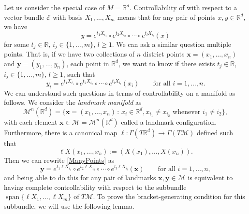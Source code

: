 \documentclass[10pt]{amsart}
\theoremstyle{remark}
\DeclareMathOperator{\spn}{span}
\newcommand{\E}{\mathcal{E}}
\newcommand{\LM}{\mathcal{M}}
\numberwithin{equation}{section}
\begin{document}
Let us consider the special case of $M = \mathbb{R}^d$. Controllability of with respect to a vector bundle $\E$ with basis $X_1, \dots, X_m$ means that for any pair of points $x, y \in \mathbb{R}^d$, we have 
$$y = e^{t_1X_{i_1}} \circ e^{t_2 X_{i_2}} \circ \cdots \circ e^{t_l X_{i_l}}(x)$$
for some $t_j \in \mathbb{R}$, $i_j \in \{ 1, \dots, m\}$, $l \geq 1$. We can ask a similar question multiple points. That is, if we have two collections of $n$ district points $\mathbf{x} = (x_1,\dots, x_n)$ and $\mathbf{y} = (y_1, \dots, y_n)$, each point in $\mathbb{R}^d$, we want to know if there exists $t_j \in \mathbb{R}$, $i_j \in \{ 1, \dots, m\}$, $l \geq 1$, such that
\begin{equation} \label{ManyPoints} y_i = e^{t_1X_{i_1}} \circ e^{t_2 X_{i_2}} \circ \cdots \circ e^{t_l X_{i_l}}(x_i) \qquad \text{for all $i=1,\dots,n$}.\end{equation}
We can understand such questions in terms of controllability on a manifold as follows. We consider the \emph{landmark manifold} as
$$\LM^n(\mathbb{R}^d) = \{ \mathbf{x} =(x_1, \dots, x_n) \, : \, x_{i} \in \mathbb{R}^d, x_{i_1} \neq x_{i_2} \text{ whenever $i_1 \neq i_2$} \},$$
with each element $\mathbf{x} \in \LM = \LM^n(\mathbb{R}^d)$ called a landmark configuration. Furthermore, there is a canonical map $\ell:\Gamma(T\mathbb{R}^d) \to \Gamma(T\LM)$ defined such that
$$\ell X(x_1, \dots, x_n) := (X(x_1), \dots, X(x_n)).$$
Then we can rewrite \eqref{ManyPoints} as
\begin{equation} \mathbf{y} = e^{t_1 \ell X_{i_1}} \circ e^{t_2 \ell X_{i_2}} \circ \cdots \circ e^{t_l \ell X_{i_l}}(\mathbf{x}) \qquad \text{for all $i=1,\dots,n$},\end{equation}
and being able to do this for any pair of landmarks $\mathbf{x}, \mathbf{y} \in \LM$ is equivalent to having complete controllability with respect to the subbundle $\spn \{ \ell X_1, \dots, \ell X_m \}$ of $T\LM$. To prove the bracket-generating condition for this subbundle, we will use the following lemma.
\end{document}
